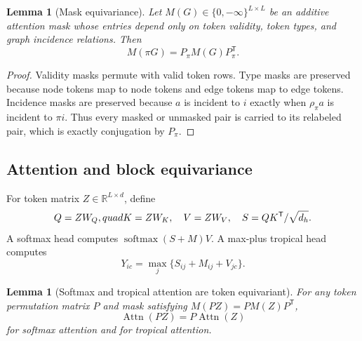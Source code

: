 \documentclass[11pt]{article}
\theoremstyle{definition}
\theoremstyle{plain}
\newtheorem{lemma}[definition]{Lemma}
\theoremstyle{remark}
\numberwithin{equation}{section}
\newcommand{\R}{\mathbb{R}}
\newcommand{\softmax}{\operatorname{softmax}}
\newcommand{\transpose}{^{\mathsf T}}
\begin{document}
\begin{lemma}[Mask equivariance]
Let $M(G)\in\{0,-\infty\}^{L\times L}$ be an additive attention mask whose entries depend only on token validity, token types, and graph incidence relations.  Then
\begin{equation}
  M(\pi G)=P_\pi M(G)P_\pi\transpose.
\end{equation}
\end{lemma}

\begin{proof}
Validity masks permute with valid token rows.  Type masks are preserved because node tokens map to node tokens and edge tokens map to edge tokens.  Incidence masks are preserved because $a$ is incident to $i$ exactly when $\rho_\pi a$ is incident to $\pi i$.  Thus every masked or unmasked pair is carried to its relabeled pair, which is exactly conjugation by $P_\pi$.
\end{proof}

\subsection{Attention and block equivariance}

For token matrix $Z\in\R^{L\times d}$, define
\begin{equation}
  Q=ZW_Q,\\quad K=ZW_K,
  \quad V=ZW_V,
  \quad S=QK\transpose/\sqrt{d_h}.
\end{equation}
A softmax head computes $\softmax(S+M)V$.  A max-plus tropical head computes
\begin{equation}
  Y_{ic}=\max_j\{S_{ij}+M_{ij}+V_{jc}\}.
\end{equation}

\begin{lemma}[Softmax and tropical attention are token equivariant]
For any token permutation matrix $P$ and mask satisfying $M(PZ)=PM(Z)P\transpose$,
\begin{equation}
  \operatorname{Attn}(PZ)=P\operatorname{Attn}(Z)
\end{equation}
for softmax attention and for tropical attention.
\end{lemma}
\end{document}
